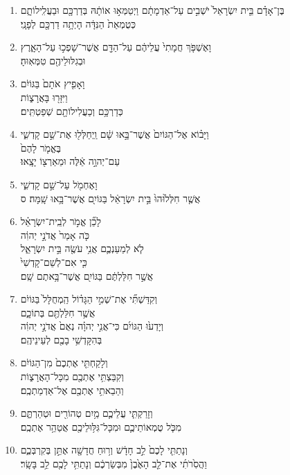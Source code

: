 \documentclass[12pt,a4paper,titlepage]{article}
\def \pslabelsep{-0.9em} %
\def \psleftmargin{0em} %
\begin{document}
\begin{enumerate}[leftmargin=\psleftmargin, labelsep = \pslabelsep, label={\arabic*}, font=\color{\pscolor}\small\textsuperscript, parsep=0em, itemsep=0em, topsep=0em ]
\item \texthebrew{בֶּן־אָדָ֗ם בֵּ֤ית יִשְׂרָאֵל֙ יֹשְׁבִ֣ים עַל־אַדְמָתָ֔ם וַיְטַמְּא֣וּ אוֹתָ֔הּ בְּדַרְכָּ֖ם וּבַעֲלִֽילוֹתָ֑ם \\ כְּטֻמְאַת֙ הַנִּדָּ֔ה הָיְתָ֥ה דַרְכָּ֖ם לְפָנָֽי׃}
\item \texthebrew{וָאֶשְׁפֹּ֤ךְ חֲמָתִי֙ עֲלֵיהֶ֔ם עַל־הַדָּ֖ם אֲשֶׁר־שָׁפְכ֣וּ עַל־הָאָ֑רֶץ \\ וּבְגִלּוּלֵיהֶ֖ם טִמְּאֽוּהָ׃}
\item \texthebrew{וָאָפִ֤יץ אֹתָם֙ בַּגּוֹיִ֔ם \\ וַיִּזָּר֖וּ בָּאֲרָצ֑וֹת \\ כְּדַרְכָּ֥ם וְכַעֲלִילוֹתָ֖ם שְׁפַטְתִּֽים׃}
\item \texthebrew{וַיָּב֗וֹא אֶל־הַגּוֹיִם֙ אֲשֶׁר־בָּ֣אוּ שָׁ֔ם וַֽיְחַלְּל֖וּ אֶת־שֵׁ֣ם קָדְשִׁ֑י \\ בֶּאֱמֹ֤ר לָהֶם֙ \\ עַם־יְהוָ֣ה אֵ֔לֶּה וּמֵאַרְצ֖וֹ יָצָֽאוּ׃}
\item \texthebrew{וָאֶחְמֹ֖ל עַל־שֵׁ֣ם קָדְשִׁ֑י \\ אֲשֶׁ֤ר חִלְּל֙וּהוּ֙ בֵּ֣ית יִשְׂרָאֵ֔ל בַּגּוֹיִ֖ם אֲשֶׁר־בָּ֥אוּ שָֽׁמָּה׃ ס} \parSpace
\item \texthebrew{לָכֵ֞ן אֱמֹ֣ר לְבֵֽית־יִשְׂרָאֵ֗ל \\ כֹּ֤ה אָמַר֙ אֲדֹנָ֣י יְהוִ֔ה \\ לֹ֧א לְמַעַנְכֶ֛ם אֲנִ֥י עֹשֶׂ֖ה בֵּ֣ית יִשְׂרָאֵ֑ל \\ כִּ֤י אִם־לְשֵׁם־קָדְשִׁי֙ \\ אֲשֶׁ֣ר חִלַּלְתֶּ֔ם בַּגּוֹיִ֖ם אֲשֶׁר־בָּ֥אתֶם שָֽׁם׃}
\item \texthebrew{וְקִדַּשְׁתִּ֞י אֶת־שְׁמִ֣י הַגָּד֗וֹל הַֽמְחֻלָּל֙ בַּגּוֹיִ֔ם \\ אֲשֶׁ֥ר חִלַּלְתֶּ֖ם בְּתוֹכָ֑ם \\ וְיָדְע֙וּ הַגּוֹיִ֜ם כִּי־אֲנִ֣י יְהוָ֗ה נְאֻם֙ אֲדֹנָ֣י יְהוִ֔ה \\ בְּהִקָּדְשִׁ֥י בָכֶ֖ם לְעֵינֵיהֶֽם׃}
\item \texthebrew{וְלָקַחְתִּ֤י אֶתְכֶם֙ מִן־הַגּוֹיִ֔ם \\ וְקִבַּצְתִּ֥י אֶתְכֶ֖ם מִכָּל־הָאֲרָצ֑וֹת \\ וְהֵבֵאתִ֥י אֶתְכֶ֖ם אֶל־אַדְמַתְכֶֽם׃}
\item \texthebrew{וְזָרַקְתִּ֧י עֲלֵיכֶ֛ם מַ֥יִם טְהוֹרִ֖ים וּטְהַרְתֶּ֑ם \\ מִכֹּ֧ל טֻמְאוֹתֵיכֶ֛ם וּמִכָּל־גִּלּ֥וּלֵיכֶ֖ם אֲטַהֵ֥ר אֶתְכֶֽם׃}
\item \texthebrew{וְנָתַתִּ֤י לָכֶם֙ לֵ֣ב חָדָ֔שׁ וְר֥וּחַ חֲדָשָׁ֖ה אֶתֵּ֣ן בְּקִרְבְּכֶ֑ם \\ וַהֲסִ֙רֹתִ֜י אֶת־לֵ֤ב הָאֶ֙בֶן֙ מִבְּשַׂרְכֶ֔ם וְנָתַתִּ֥י לָכֶ֖ם לֵ֥ב בָּשָֽׂר׃}

\end{enumerate}
\end{document}

